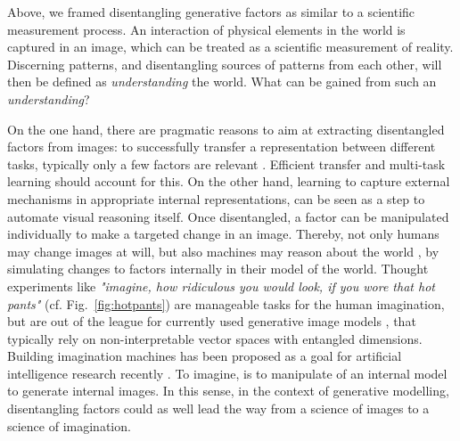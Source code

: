 	Above, we framed disentangling generative factors as similar to a scientific measurement process. An interaction of physical elements in the world is captured in an image, which can be treated as a scientific measurement of reality. Discerning patterns, and disentangling sources of patterns from each other, will then be defined as \textit{understanding} the world. What can be gained from such an \textit{understanding}?

	On the one hand, there are pragmatic reasons to aim at extracting disentangled factors from images: to successfully transfer a representation between different tasks, typically only a few factors are relevant \cite{bengio13rep}.
	Efficient transfer and multi-task learning should account for this.
	On the other hand, learning to capture external mechanisms in appropriate internal representations, can be seen as a step to automate visual reasoning itself.
	Once disentangled, a factor can be manipulated individually to make a targeted change in an image. Thereby, not only humans may change images at will, but also machines may reason about the world \cite{pearl18impediments}, by simulating changes to factors internally in their model of the world.
	Thought experiments like \textit{"imagine, how ridiculous you would look, if you wore that hot pants"} (cf. Fig.~\ref{fig:hotpants}) are manageable tasks for the human imagination, but are out of the league for currently used generative image models \cite{goodfellow14gan, kingma13vae}, that typically rely on non-interpretable vector spaces with entangled dimensions.
	Building imagination machines has been proposed as a goal for artificial intelligence research recently \cite{mahadevan18imagine}.
	To imagine, is to manipulate of an internal model to generate internal images.
	In this sense, in the context of generative modelling, disentangling factors could as well lead the way from a science of images to a science of imagination.

